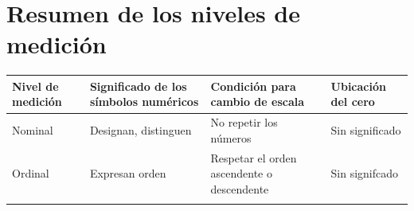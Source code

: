 \documentclass[]{book}
\begin{document}
\hypertarget{resumen-de-los-niveles-de-medicion}{%
\section{Resumen de los niveles de medición}\label{resumen-de-los-niveles-de-medicion}}

\begin{longtable}[]{@{}llll@{}}
\toprule
\begin{minipage}[b]{0.14\columnwidth}\raggedright
Nivel de medición\strut
\end{minipage} & \begin{minipage}[b]{0.29\columnwidth}\raggedright
Significado de los símbolos numéricos\strut
\end{minipage} & \begin{minipage}[b]{0.32\columnwidth}\raggedright
Condición para cambio de escala\strut
\end{minipage} & \begin{minipage}[b]{0.14\columnwidth}\raggedright
Ubicación del cero\strut
\end{minipage}\tabularnewline
\midrule
\endhead
\begin{minipage}[t]{0.14\columnwidth}\raggedright
Nominal\strut
\end{minipage} & \begin{minipage}[t]{0.29\columnwidth}\raggedright
Designan, distinguen\strut
\end{minipage} & \begin{minipage}[t]{0.32\columnwidth}\raggedright
No repetir los números\strut
\end{minipage} & \begin{minipage}[t]{0.14\columnwidth}\raggedright
Sin significado\strut
\end{minipage}\tabularnewline
\begin{minipage}[t]{0.14\columnwidth}\raggedright
Ordinal\strut
\end{minipage} & \begin{minipage}[t]{0.29\columnwidth}\raggedright
Expresan orden\strut
\end{minipage} & \begin{minipage}[t]{0.32\columnwidth}\raggedright
Respetar el orden ascendente o descendente\strut
\end{minipage} & \begin{minipage}[t]{0.14\columnwidth}\raggedright
Sin signifcado\strut
\end{minipage}\tabularnewline
\begin{minipage}[t]{0.14\columnwidth}\raggedright

\end{minipage}
\end{longtable}
\end{document}
